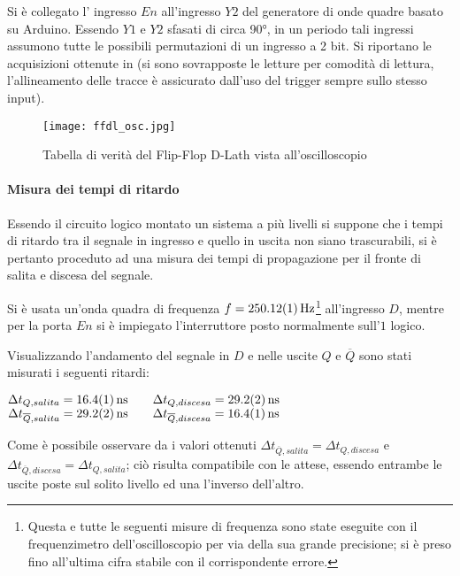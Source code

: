 Si è collegato l' ingresso $En$ all'ingresso $Y2$ del generatore di onde quadre basato su Arduino. Essendo 	$Y1$ e 	$Y2$ sfasati di circa \ang{90}, in un periodo tali ingressi assumono tutte le possibili permutazioni di un ingresso a 2 bit.
Si riportano le acquisizioni ottenute in  (si sono sovrapposte le letture per comodità di lettura, l'allineamento delle tracce è assicurato dall'uso del trigger sempre sullo stesso input).

	\begin{figure}[htb]
		\centering
		\texttt{[image: ffdl\_osc.jpg]}
		\caption{Tabella di verità del Flip-Flop D-Lath vista all'oscilloscopio}
		\label{fig:stocazzo}
	\end{figure}
	
\paragraph{Misura dei tempi di ritardo}
	Essendo il circuito logico montato un sistema a più livelli
	si suppone che i tempi di ritardo tra il segnale in ingresso e quello in uscita non siano trascurabili, si è pertanto proceduto ad una misura dei tempi di propagazione per il fronte di salita e discesa del segnale.

	Si è usata un'onda quadra di frequenza $f=\SI{250.12\pm 0.01}{\hertz}$\footnote{Questa e tutte le seguenti misure di frequenza sono state eseguite con il frequenzimetro dell'oscilloscopio per via della sua grande precisione; si è preso fino all'ultima cifra stabile con il corrispondente errore.} all'ingresso $D$, mentre per la porta $En$ si è impiegato l'interruttore  posto normalmente sull'$1$ logico.

	Visualizzando l'andamento del segnale in $D$ e nelle uscite $Q$ e $\overline{Q}$
	sono stati misurati i seguenti ritardi:\\
	\begin{center}
		$\Delta t_{Q,salita}=\SI{16.4 \pm 0.1}{\ns} \qquad  \Delta t_{Q,discesa}=\SI{29.2 \pm 0.2}{\ns} $\\
		$\Delta t_{\overline{Q},salita}=\SI{29.2 \pm 0.2}{\ns} \qquad  \Delta t_{\overline{Q},discesa}=\SI{16.4 \pm 0.1}{\ns}$\\
	\end{center}

	Come è possibile osservare da i valori ottenuti $\Delta t_{\overline{Q},salita} = \Delta t_{{Q},discesa}$ e $\Delta t_{\overline{Q},discesa} = \Delta t_{{Q},salita}$; ciò risulta compatibile con le attese, essendo entrambe le uscite poste sul solito livello ed una l'inverso dell'altro.
